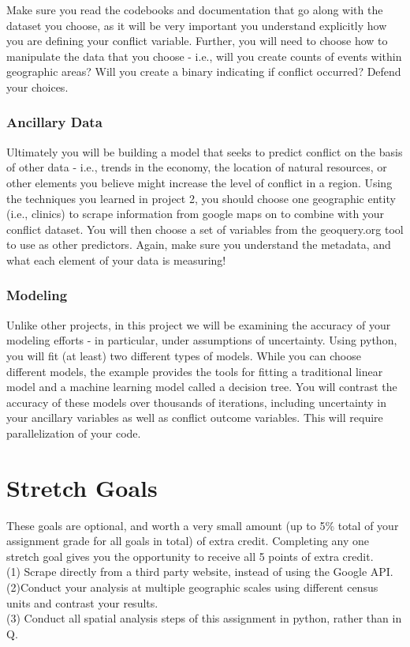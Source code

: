 \documentclass[a4paper, 11pt]{article}
\begin{document}
Make sure you read the codebooks and documentation that go along with the dataset you choose, as it will be very important you understand explicitly how you are defining your conflict variable.  Further, you will need to choose how to manipulate the data that you choose - i.e., will you create counts of events within geographic areas?  Will you create a binary indicating if conflict occurred?  Defend your choices.

\subsubsection{Ancillary Data}
Ultimately you will be building a model that seeks to predict conflict on the basis of other data - i.e., trends in the economy, the location of natural resources, or other elements you believe might increase the level of conflict in a region.  Using the techniques you learned in project 2, you should choose one geographic entity (i.e., clinics) to scrape information from google maps on to combine with your conflict dataset.  You will then choose a set of variables from the geoquery.org tool to use as other predictors.  Again, make sure you understand the metadata, and what each element of your data is measuring!

\subsubsection{Modeling}
Unlike other projects, in this project we will be examining the accuracy of your modeling efforts - in particular, under assumptions of uncertainty.  Using python, you will fit (at least) two different types of models.  While you can choose different models, the example provides the tools for fitting a traditional linear model and a machine learning model called a decision tree.  You will contrast the accuracy of these models over thousands of iterations, including uncertainty in your ancillary variables as well as conflict outcome variables.  This will require parallelization of your code.

\section{Stretch Goals}
These goals are optional, and worth a very small amount (up to 5\% total of your assignment grade for all goals in total) of extra credit.  Completing any one stretch goal gives you the opportunity to receive all 5 points of extra credit.\\
(1) Scrape directly from a third party website, instead of using the Google API.\\
(2)Conduct your analysis at multiple geographic scales using different census units and contrast your results.\\
(3) Conduct all spatial analysis steps of this assignment in python, rather than in Q.
\end{document}
